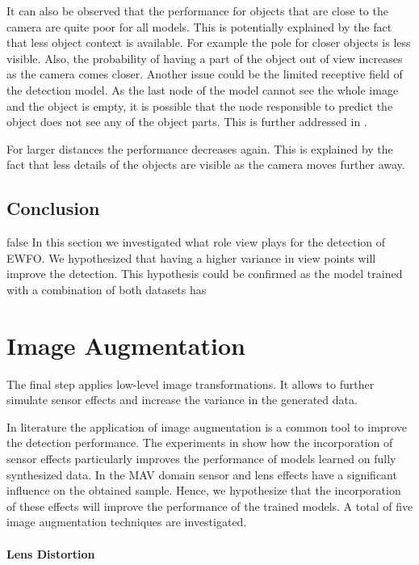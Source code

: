 It can also be observed that the performance for objects that are close to the camera are quite poor for all models. This is potentially explained by the fact that less object context is available. For example the pole for closer objects is less visible. Also, the probability of having a part of the object out of view increases as the camera comes closer. Another issue could be the limited receptive field of the detection model. As the last node of the model cannot see the whole image and the object is empty, it is possible that the node responsible to predict the object does not see any of the object parts. This is further addressed in .

For larger distances the performance decreases again. This is explained by the fact that less details of the objects are visible as the camera moves further away.
\fi
\subsection{Conclusion}
\if false
In this section we investigated what role view plays for the detection of \ac{EWFO}. We hypothesized that having a higher variance in view points will improve the detection. This hypothesis could be confirmed as the model trained with a combination of both datasets has

\fi
\section{Image Augmentation}

The final step applies low-level image transformations. It allows to further simulate sensor effects and increase the variance in the generated data.

In literature \cite{Krizhevsky2012a,Howard2013,Redmon,Liu} the application of image augmentation is a common tool to improve the detection performance. The experiments in \cite{Carlson2018} show how the incorporation of sensor effects particularly improves the performance of models learned on fully synthesized data. In the \ac{MAV} domain sensor and lens effects have a significant influence on the obtained sample. Hence, we hypothesize that the incorporation of these effects will improve the performance of the trained models. A total of  five image augmentation techniques are investigated.

\paragraph{Lens Distortion}

